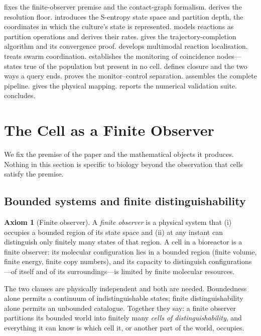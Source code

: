 \documentclass[11pt,twocolumn,a4paper]{article}
\theoremstyle{thmstyle}
\theoremstyle{definition}
\newtheorem{axiom}{Axiom}
\theoremstyle{remark}
\begin{document}
 fixes the finite-observer premise and the contact-graph
formalism.  derives the resolution floor.
 introduces the S-entropy state space and partition depth,
the coordinates in which the culture's state is represented.
 models reactions as partition operations and derives
their rates.  gives the trajectory-completion
algorithm and its convergence proof.  develops
multimodal reaction localisation.  treats swarm
coordination.  establishes the monitoring of
coincidence nodes---states true of the population but present in no cell.
 defines closure and the two ways a query ends.  proves the monitor--control separation.
 assembles the complete pipeline. 
gives the physical mapping.  reports the numerical
validation suite.  concludes.

\section{The Cell as a Finite Observer}
\label{sec:observer}

We fix the premise of the paper and the mathematical objects it produces.
Nothing in this section is specific to biology beyond the observation that
cells satisfy the premise.

\subsection{Bounded systems and finite distinguishability}

\begin{axiom}[Finite observer]
\label{ax:observer}
A \emph{finite observer} is a physical system that (i) occupies a bounded
region of its state space and (ii) at any instant can distinguish only
finitely many states of that region. A cell in a bioreactor is a finite
observer: its molecular configuration lies in a bounded region (finite
volume, finite energy, finite copy numbers), and its capacity to
distinguish configurations---of itself and of its surroundings---is limited
by finite molecular resources.
\end{axiom}

The two clauses are physically independent and both are needed.
Boundedness alone permits a continuum of indistinguishable states; finite
distinguishability alone permits an unbounded catalogue. Together they say:
a finite observer partitions its bounded world into finitely many
\emph{cells of distinguishability}, and everything it can know is which cell
it, or another part of the world, occupies.
\end{document}
